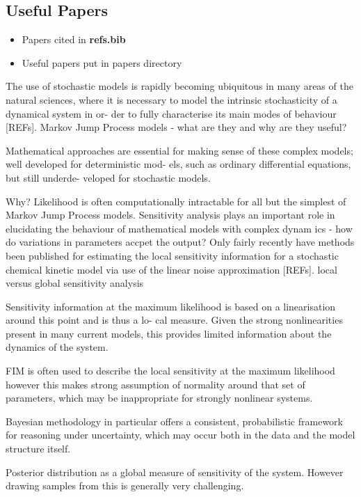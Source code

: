 \documentclass{pnastwo}
\begin{document}
\begin{article}
\section{Useful Papers}

\begin{itemize}
\item Papers cited in \textbf{refs.bib}
\item Useful papers put in papers directory
\end{itemize}



The use of stochastic models is rapidly becoming ubiquitous in many areas of the
natural sciences, where it is necessary to model the intrinsic stochasticity of
a dynamical system in or- der to fully characterise its main modes of behaviour
[REFs]. Markov Jump Process models - what are they and why are they useful?

Mathematical approaches are essential for making sense of these complex models;
well developed for deterministic mod- els, such as ordinary differential
equations, but still underde- veloped for stochastic models.

Why? Likelihood is often computationally intractable for
all but the simplest of Markov Jump Process models.
Sensitivity analysis plays an important role in elucidating
the behaviour of mathematical models with complex dynam
ics - how do variations in parameters accpet the output? Only
fairly recently have methods been published for estimating the
local sensitivity information for a stochastic chemical kinetic
model via use of the linear noise approximation [REFs].
local versus global sensitivity analysis

Sensitivity information at the maximum likelihood is
based on a linearisation around this point and is thus a lo-
cal measure. Given the strong nonlinearities present in many
current models, this provides limited information about the
dynamics of the system.

FIM is often used to describe the local sensitivity at the
maximum likelihood however this makes strong assumption
of normality around that set of parameters, which may be
inappropriate for strongly nonlinear systems.

Bayesian methodology in particular offers a consistent,
probabilistic framework for reasoning under uncertainty,
which may occur both in the data and the model structure
itself.

Posterior distribution as a global measure of sensitivity of
the system. However drawing samples from this is generally
very challenging.


\end{article}
\end{document}
